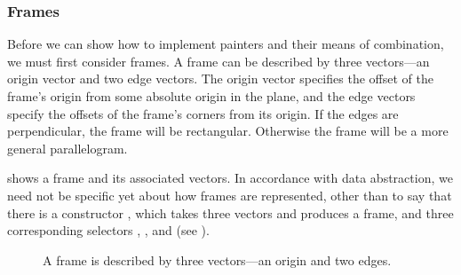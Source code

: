 \subsubsection*{Frames}

Before we can show how to implement painters and their means of combination, we must first consider frames.
A frame can be described by three vectors---an origin vector and two edge vectors.
The origin vector specifies the offset of the frame’s origin from some absolute origin in the plane, and the edge vectors specify the offsets of the frame’s corners from its origin.
If the edges are perpendicular, the frame will be rectangular.
Otherwise the frame will be a more general parallelogram.

 shows a frame and its associated vectors.
In accordance with data abstraction, we need not be specific yet about how frames are represented, other than to say that there is a constructor , which takes three vectors and produces a frame, and three corresponding selectors , , and  (see ).

\begin{figure}[tb]
	\centering
	
	\caption{
		A frame is described by three vectors---an origin and two edges.
	}
	\label{Figure 2.15}
\end{figure}

